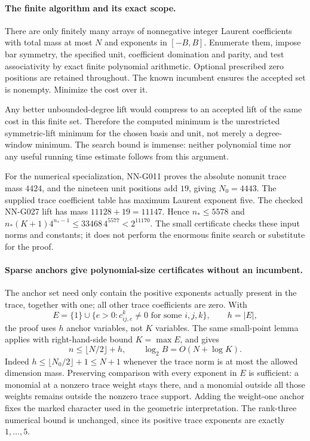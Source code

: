 \paragraph{The finite algorithm and its exact scope.}
There are only finitely many arrays of nonnegative integer
Laurent coefficients with total mass at most $N$ and
exponents in $[-B,B]$. Enumerate them, impose bar symmetry,
the specified unit, coefficient domination and parity,
and test associativity by exact finite polynomial
arithmetic. Optional prescribed zero positions are
retained throughout. The known incumbent ensures the
accepted set is nonempty. Minimize the cost over it.

Any better unbounded-degree lift would compress to an
accepted lift of the same cost in this finite set.
Therefore the computed minimum is the unrestricted
symmetric-lift minimum for the chosen basis and unit,
not merely a degree-window minimum. The search bound is
immense: neither polynomial time nor any useful running
time estimate follows from this argument.

For the numerical specialization, NN-G011 proves the
absolute nonunit trace mass $4424$, and the nineteen
unit positions add $19$, giving $N_0=4443$.
The supplied trace coefficient table has maximum
Laurent exponent five. The checked NN-G027 lift has
mass $11128+19=11147$. Hence $n_*\le5578$ and
$n_*(K+1)4^{n_*-1}\le33468\,4^{5577}<2^{11170}$.
The small certificate
 checks
these input norms and constants; it does not perform
the enormous finite search or substitute for the proof.

\paragraph{Sparse anchors give polynomial-size certificates without an incumbent.}
The anchor set need only contain the positive exponents
actually present in the trace, together with one; all
other trace coefficients are zero. With
\[
 E=\{1\}\cup\{e>0:c_{ij,e}^k\ne0\text{ for some }i,j,k\},
 \qquad h=|E|,
\]
the proof uses $h$ anchor variables, not $K$ variables.
The same small-point lemma applies with right-hand-side
bound $K=\max E$, and gives
\[
 n\le\lfloor N/2\rfloor+h,\qquad
 \log_2 B=O(N+\log K).                              \tag{G029.7}
\]
Indeed $h\le\lfloor N_0/2\rfloor+1\le N+1$ whenever
the trace norm is at most the allowed dimension mass.
Preserving comparison with every exponent in $E$ is
sufficient: a monomial at a nonzero trace weight stays
there, and a monomial outside all those weights remains
outside the nonzero trace support. Adding the weight-one
anchor fixes the marked character used in the geometric
interpretation. The rank-three numerical bound is unchanged,
since its positive trace exponents are exactly $1,\ldots,5$.

